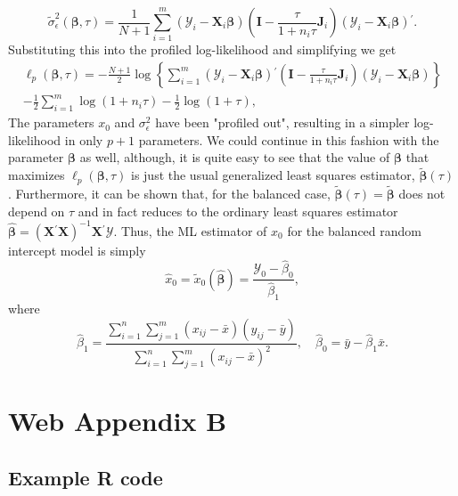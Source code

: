 \documentclass{article}\usepackage[]{graphicx}\usepackage[]{color}
\newcommand{\trans}{\ensuremath{^\prime}}
\newcommand{\proglang}[1]{\textsf{#1}}
\newcommand{\X}{\ensuremath{\bm{X}}}
\begin{document}
\[
  \widetilde{\sigma}_\epsilon^2\left(\bm{\beta}, \tau\right) = \frac{1}{N + 1}\sum_{i = 1}^m \left(\bm{\mathcal{Y}}_i - \X_i\bm{\beta}\right)\left(\bm{I} - \frac{\tau}{1 + n_i\tau}\bm{J}_i\right)\left(\bm{\mathcal{Y}}_i - \X_i\bm{\beta}\right)\trans.
\]
Substituting this into the profiled log-likelihood and simplifying we get
\begin{multline*}
  \mathcal{\ell}_p\left(\bm{\beta}, \tau\right) = -\frac{N+1}{2}\log\left\{\sum_{i = 1}^m \left(\bm{\mathcal{Y}}_i - \X_i\bm{\beta}\right)\trans\left(\bm{I} - \frac{\tau}{1 + n_i\tau}\bm{J}_i\right)\left(\bm{\mathcal{Y}}_i - \X_i\bm{\beta}\right)\right\} \\ - \frac{1}{2}\sum_{i = 1}^m \log\left(1 + n_i\tau\right) - \frac{1}{2}\log\left(1 + \tau\right),
\end{multline*}
The parameters $x_0$ and $\sigma_\epsilon^2$ have been "profiled out", resulting in a simpler log-likelihood in only $p + 1$ parameters. We could continue in this fashion with the parameter $\bm{\beta}$ as well, although, it is quite easy to see that the value of $\bm{\beta}$ that maximizes $\mathcal{\ell}_p\left(\bm{\beta}, \tau\right)$ is just the usual generalized least squares estimator, $\widetilde{\bm{\beta}}\left(\tau\right)$. Furthermore, it can be shown \citep{demidenko_mixed_2013} that, for the balanced case, $\widetilde{\bm{\beta}}\left(\tau\right) = \widetilde{\bm{\beta}}$ does not depend on $\tau$ and in fact reduces to the ordinary least squares estimator $\widehat{\bm{\beta}} = \left(\X\trans\X\right)^{-1}\X\trans\bm{\mathcal{Y}}$. Thus, the ML estimator of $x_0$ for the balanced random intercept model is simply
\[
  \widehat{x}_0 = \widetilde{x}_0\left(\widehat{\bm{\beta}}\right) = \frac{\mathcal{Y}_0 - \widehat{\beta}_0}{\widehat{\beta}_1},
\]
where 
\[
  \widehat{\beta}_1 = \frac{\sum_{i=1}^n\sum_{j=1}^m\left(x_{ij}-\bar{x}\right)\left(y_{ij}-\bar{y}\right)}{\sum_{i=1}^n\sum_{j=1}^m\left(x_{ij}-\bar{x}\right)^2}, \quad \widehat{\beta}_0 = \bar{y} - \widehat{\beta}_1\bar{x}.
\]

\section*{Web Appendix B}
\subsection*{Example \proglang{R} code}
\end{document}
